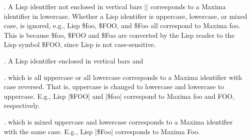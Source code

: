 \documentclass[../Maxima_Workbook.tex]{subfiles}
\begin{document}
. A Lisp identifier not enclosed in vertical bars $ || $ corresponds to a Maxima identifier in lowercase. Whether a Lisp identifier is uppercase, lowercase, or mixed case, is ignored, e.g., Lisp \$foo, \$FOO, and \$Foo all correspond to Maxima foo. This is because \$foo, \$FOO and \$Foo are converted by the Lisp reader to the Lisp symbol \$FOO, since Lisp is not case-sensitive.

. A Lisp identifier enclosed in vertical bars and

. which is all uppercase or all lowercase corresponds to a Maxima identifier with case reversed. That is, uppercase is changed to lowercase and lowercase to uppercase. E.g., Lisp |\$FOO| and |\$foo| correspond to Maxima foo and FOO, respectively.

. which is mixed uppercase and lowercase corresponds to a Maxima identifier with the same case. E.g., Lisp |\$Foo| corresponds to Maxima Foo.
\end{document}
